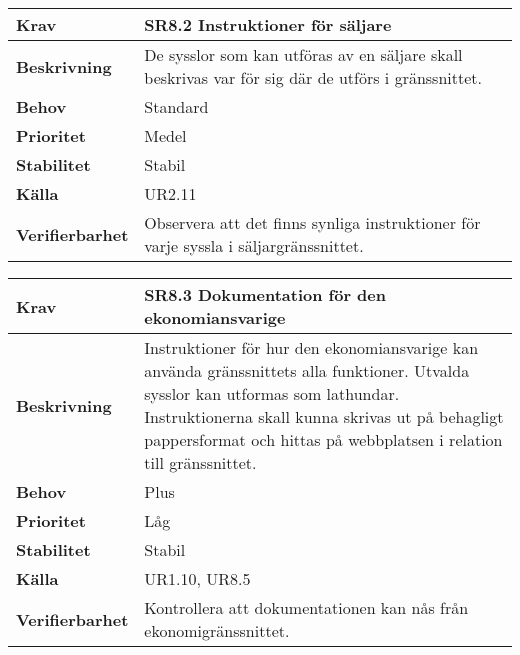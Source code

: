 \documentclass[a4paper, twoside, 11pt, titlepage]{article}
\begin{document}
		\begin {table} [ht] \begin{tabular} { p{2.6cm} p{12.5cm} }
			\hline
			\sffamily\textbf{Krav} & \sffamily\textbf{SR8.2 Instruktioner för säljare } \\
			\hline
			\sffamily\textbf{Beskrivning} & De sysslor som kan utföras av en säljare skall beskrivas var för sig där de utförs i gränssnittet.  \\
			\hline
			\sffamily\textbf{Behov} & Standard  \\
			\hline
			\sffamily\textbf{Prioritet} & Medel  \\
			\hline
			\sffamily\textbf{Stabilitet} & Stabil  \\
			\hline
			\sffamily\textbf{Källa} & UR2.11  \\
			\hline
			\sffamily\textbf{Verifierbarhet} & Observera att det finns synliga instruktioner för varje syssla i säljargränssnittet.  \\
			\hline
		\end{tabular} \end{table} \FloatBarrier
		\vspace{6mm}

		\begin {table} [ht] \begin{tabular} { p{2.6cm} p{12.5cm} }
			\hline
			\sffamily\textbf{Krav} & \sffamily\textbf{SR8.3 Dokumentation för den ekonomiansvarige } \\
			\hline
			\sffamily\textbf{Beskrivning} & Instruktioner för hur den ekonomiansvarige kan använda gränssnittets alla funktioner. Utvalda sysslor kan utformas som lathundar. Instruktionerna skall kunna skrivas ut på behagligt pappersformat och hittas på webbplatsen i relation till gränssnittet.  \\
			\hline
			\sffamily\textbf{Behov} & Plus  \\
			\hline
			\sffamily\textbf{Prioritet} & Låg  \\
			\hline
			\sffamily\textbf{Stabilitet} & Stabil  \\
			\hline
			\sffamily\textbf{Källa} & UR1.10, UR8.5  \\
			\hline
			\sffamily\textbf{Verifierbarhet} & Kontrollera att dokumentationen kan nås från ekonomigränssnittet.  \\
			\hline
		\end{tabular} \end{table} \FloatBarrier
		\vspace{6mm}
\end{document}

